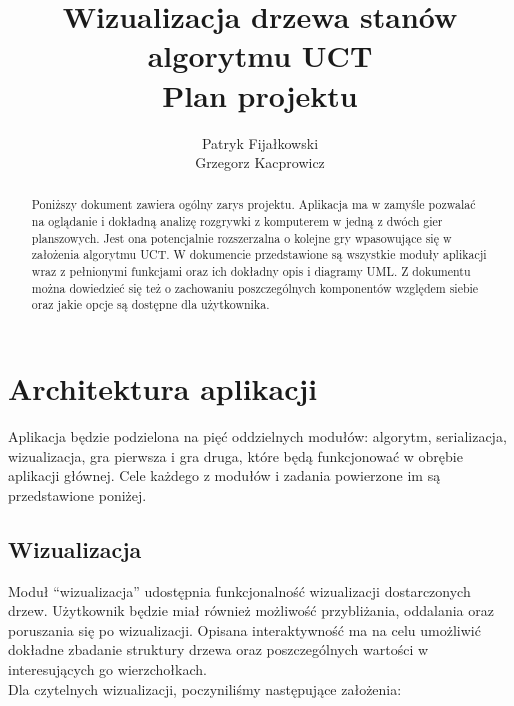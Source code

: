 \documentclass{article}
\title{
	Wizualizacja drzewa stanów algorytmu UCT \\
	\large Plan projektu}
\author{Patryk Fijałkowski \\ Grzegorz Kacprowicz}
\let\oldsection\section
\renewcommand\section{\clearpage\oldsection}
\begin{document}
	\begin{titlingpage}
		\maketitle
		\vspace{3cm}
		\begin{abstract}
			Poniższy dokument zawiera ogólny zarys projektu. Aplikacja ma w zamyśle pozwalać na oglądanie i dokładną analizę rozgrywki z komputerem w jedną z dwóch gier planszowych. Jest ona potencjalnie rozszerzalna o kolejne gry wpasowujące się w założenia algorytmu UCT. W dokumencie przedstawione są wszystkie moduły aplikacji wraz z pełnionymi funkcjami oraz ich dokładny opis i diagramy UML. Z dokumentu można dowiedzieć się też o zachowaniu poszczególnych komponentów względem siebie oraz jakie opcje są dostępne dla użytkownika. 
		\end{abstract}
	\end{titlingpage}

	\begin{versionhistory}
	\end{versionhistory}
	\tableofcontents
	
	\section{Architektura aplikacji}
	Aplikacja będzie podzielona na pięć oddzielnych modułów: algorytm, serializacja, wizualizacja, gra pierwsza i gra druga, które będą funkcjonować w obrębie aplikacji głównej. Cele każdego z modułów i zadania powierzone im są przedstawione poniżej.
	
	\subsection{Wizualizacja}
	Moduł ``wizualizacja'' udostępnia funkcjonalność wizualizacji dostarczonych drzew. Użytkownik będzie miał również możliwość przybliżania, oddalania oraz poruszania się po wizualizacji. Opisana interaktywność ma na celu umożliwić dokładne zbadanie struktury drzewa oraz poszczególnych wartości w interesujących go wierzchołkach. \\
	
	\noindent Dla czytelnych wizualizacji, poczyniliśmy następujące założenia: \\
	
\end{document}
